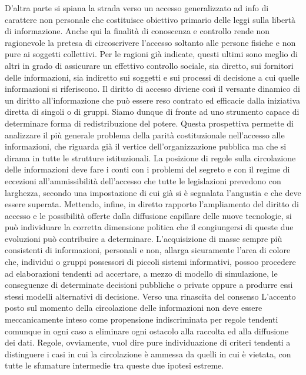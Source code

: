 D’altra parte si spiana la strada verso un accesso generalizzato ad info di carattere non personale che costituisce obiettivo primario delle leggi sulla libertà di informazione.
Anche qui la finalità di conoscenza e controllo rende non ragionevole la pretesa di circoscrivere l’accesso soltanto alle persone fisiche e non pure ai soggetti collettivi. Per le ragioni già indicate, questi ultimi sono meglio di altri in grado di assicurare un effettivo controllo sociale, sia diretto, sui fornitori delle informazioni, sia indiretto sui soggetti e sui processi di decisione a cui quelle informazioni si riferiscono. Il diritto di accesso diviene così il versante dinamico di un diritto all’informazione che può essere reso contrato ed efficacie dalla iniziativa diretta di singoli o di gruppi. Siamo dunque di fronte ad uno strumento capace di determinare forma di redistribuzione del potere.
Questa prospettiva permette di analizzare il più generale problema della parità costituzionale nell’accesso alle informazioni, che riguarda già il vertice dell’organizzazione pubblica ma che si dirama in tutte le strutture istituzionali. La posizione di regole sulla circolazione delle informazioni deve fare i conti con i problemi del segreto e con il regime di eccezioni all’ammissibilità dell’accesso che tutte le legislazioni prevedono con larghezza, secondo una impostazione di cui già si è segnalata l’angustia e che deve essere superata.
Mettendo, infine, in diretto rapporto l’ampliamento del diritto di accesso e le possibilità offerte dalla diffusione capillare delle nuove tecnologie, si può individuare la corretta dimensione politica che il congiungersi di queste due evoluzioni può contribuire a determinare. L’acquisizione di masse sempre più consistenti di informazioni, personali e non, allarga sicuramente l’area di colore che, individui o gruppi possessori di piccoli sistemi informativi, possoo procedere ad elaborazioni tendenti ad accertare, a mezzo di modello di simulazione, le conseguenze di determinate decisioni pubbliche o private oppure a produrre essi stessi modelli alternativi di decisione. 
Verso una rinascita del consenso
L’accento posto sul momento della circolazione delle informazioni non deve essere meccanicamente inteso come propensione indiscriminata per regole tendenti comunque in ogni caso a eliminare ogni ostacolo alla raccolta ed alla diffusione dei dati. Regole, ovviamente, vuol dire pure individuazione di criteri tendenti a distinguere i casi in cui la circolazione è ammessa da quelli in cui è vietata, con tutte le sfumature intermedie tra queste due ipotesi estreme.
